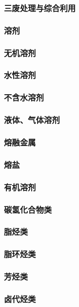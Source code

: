 \documentclass[UTF8]{../../ApplicationUniverse}
\begin{document}
    \subsubsection{三废处理与综合利用}
\subsubsection{溶剂}
    \subsubsection{无机溶剂}
        \subsubsection{水性溶剂}
        \subsubsection{不含水溶剂}
        \subsubsection{液体、气体溶剂}
        \subsubsection{熔融金属}
        \subsubsection{熔盐}
    \subsubsection{有机溶剂}
        \subsubsection{碳氢化合物类}
            \subsubsection{脂烃类}
            \subsubsection{脂环烃类}
            \subsubsection{芳烃类}
        \subsubsection{卤代烃类}
\end{document}
